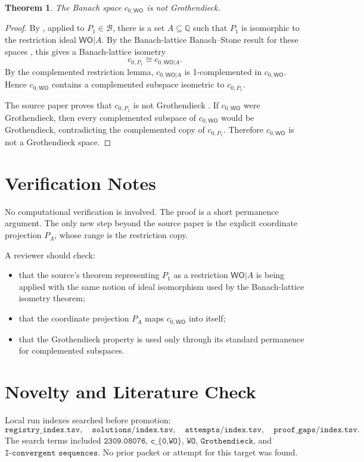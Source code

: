 \documentclass[11pt]{article}
\newtheorem{theorem}{Theorem}
\newcommand{\Q}{\mathbb Q}
\newcommand{\WO}{\mathsf{WO}}
\begin{document}
\begin{theorem}
The Banach space \(c_{0,\WO}\) is not Grothendieck.
\end{theorem}

\begin{proof}
By \cite[Theorem 5.13]{rvu2023}, applied to \(P_1\in\mathcal B\), there is a
set \(A\subseteq \Q\) such that \(P_1\) is isomorphic to the restriction ideal
\(\WO|A\).  By the Banach-lattice Banach--Stone result for these spaces
\cite[Theorem 3.3]{rvu2023}, this gives a Banach-lattice isometry
\[
  c_{0,P_1} \cong c_{0,\WO|A}.
\]
By the complemented restriction lemma, \(c_{0,\WO|A}\) is 1-complemented in
\(c_{0,\WO}\).  Hence \(c_{0,\WO}\) contains a complemented subspace isometric
to \(c_{0,P_1}\).

The source paper proves that \(c_{0,P_1}\) is not Grothendieck
\cite[Theorem 5.19]{rvu2023}.  If \(c_{0,\WO}\) were Grothendieck, then every
complemented subspace of \(c_{0,\WO}\) would be Grothendieck, contradicting
the complemented copy of \(c_{0,P_1}\).  Therefore \(c_{0,\WO}\) is not a
Grothendieck space.
\end{proof}

\section*{Verification Notes}

No computational verification is involved.  The proof is a short permanence
argument.  The only new step beyond the source paper is the explicit
coordinate projection \(P_A\), whose range is the restriction copy.

A reviewer should check:
\begin{itemize}
\item that the source's theorem representing \(P_1\) as a restriction
\(\WO|A\) is being applied with the same notion of ideal isomorphism used by
the Banach-lattice isometry theorem;
\item that the coordinate projection \(P_A\) maps \(c_{0,\WO}\) into itself;
\item that the Grothendieck property is used only through its standard
permanence for complemented subspaces.
\end{itemize}

\section*{Novelty and Literature Check}

Local run indexes searched before promotion:
\[
\texttt{registry\_index.tsv},\quad
\texttt{solutions/index.tsv},\quad
\texttt{attempts/index.tsv},\quad
\texttt{proof\_gaps/index.tsv}.
\]
The search terms included \(\texttt{2309.08076}\), \(\texttt{c\_\{0,WO\}}\),
\(\texttt{WO}\), \(\texttt{Grothendieck}\), and
\(\texttt{I-convergent sequences}\).  No prior packet or attempt for this
target was found.
\end{document}
